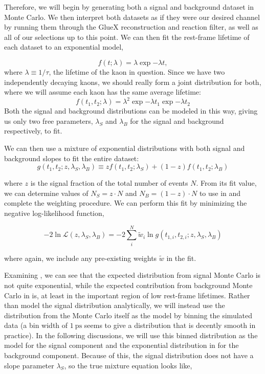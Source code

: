 Therefore, we will begin by generating both a signal and background dataset in Monte Carlo. We then interpret both datasets as if they were our desired channel by running them through the GlueX reconstruction and reaction filter, as well as all of our selections up to this point. We can then fit the rest-frame lifetime of each dataset to an exponential model,

\begin{equation}
  f(t; \lambda) = \lambda \exp{-\lambda t},
  \label{eq:splot-exponential}
\end{equation}
where $\lambda \equiv 1/\tau$, the lifetime of the kaon in question. Since we have two independently decaying kaons, we should really form a joint distribution for both, where we will assume each kaon has the same average lifetime:
\begin{equation}
  f(t_1, t_2; \lambda) = \lambda^2 \exp{-\lambda t_1}\exp{-\lambda t_2}
  \label{eq:splot-exponential_joint}
\end{equation}
Both the signal and background distributions can be modeled in this way, giving us only two free parameters, $\lambda_S$ and $\lambda_B$ for the signal and background respectively, to fit.

We can then use a mixture of exponential distributions with both signal and background slopes to fit the entire dataset:
\begin{equation}
  g(t_1, t_2; z, \lambda_S, \lambda_B) \equiv z f(t_1, t_2; \lambda_S) + (1-z) f(t_1, t_2; \lambda_B)
  \label{eq:splot-mixture-exp}
\end{equation}

where $z$ is the signal fraction of the total number of events $N$. From its fit value, we can determine values of $N_S = z\cdot N$ and $N_B = (1-z)\cdot N$ to use in  and complete the weighting procedure. We can perform this fit by minimizing the negative log-likelihood function,

\begin{equation}
  -2\ln\mathcal{L}(z, \lambda_S, \lambda_B) = -2\sum_i^N \tilde{w}_i \ln g(t_{1,i}, t_{2,i}; z, \lambda_S, \lambda_B)
  \label{eq:splot-nll-exp}
\end{equation}

where again, we include any pre-existing weights $\tilde{w}$ in the fit.

Examining , we can see that the expected distribution from signal Monte Carlo is not quite exponential, while the expected contribution from background Monte Carlo in  is, at least in the important region of low rest-frame lifetimes. Rather than model the signal distribution analytically, we will instead use the distribution from the Monte Carlo itself as the model by binning the simulated data (a bin width of $\SI{1}{\pico\second}$ seems to give a distribution that is decently smooth in practice). In the following discussions, we will use this binned distribution as the model for the signal component and the exponential distribution in  for the background component. Because of this, the signal distribution does not have a slope parameter $\lambda_S$, so the true mixture equation looks like,

